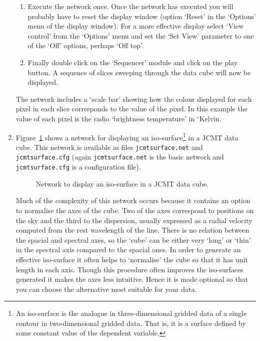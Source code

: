 \begin{enumerate}
\begin{enumerate}
    \item Execute the network once.  Once the network has executed you
     will probably have to reset the display window (option `Reset' in
     the `Options' menu of the display window).  For a more effective
     display select `View control' from the `Options' menu and set the
     `Set View' parameter to one of the `Off' options, perhaps `Off top'.

    \item Finally double click on the `Sequencer' module and click on
     the play button.  A sequence of slices sweeping through the data
     cube will now be displayed.

  \end{enumerate}

   The network includes a `scale bar' showing how the colour displayed
   for each pixel in each slice corresponds to the value of the pixel.
   In this example the value of each pixel is the radio `brightness
   temperature' in $^{\circ}$Kelvin.

  \item Figure~\ref{JCMTSURFACE} shows a network for displaying an
   iso-surface\footnote{An iso-surface is the analogue in
   three-dimensional gridded data of a single contour in two-dimensional
   gridded data. That is, it is a surface defined by some constant value
   of the dependent variable.} in a JCMT data cube.  This network is
   available as files {\tt jcmtsurface.net} and {\tt jcmtsurface.cfg}
   (again {\tt jcmtsurface.net} is the basic network and {\tt
   jcmtsurface.cfg} is a configuration file).

  \begin{figure}[htbp]

  \begin{center}
  \leavevmode
  \epsfxsize=450pt
  \end{center}

  \caption[Network to display an iso-surface in a JCMT data cube.]
   {Network to display an iso-surface in a JCMT data cube.
   \label{JCMTSURFACE} }

  \end{figure}

   Much of the complexity of this network occurs because it contains an
   option to normalise the axes of the cube.  Two of the axes correspond
   to positions on the sky and the third to the dispersion, usually
   expressed as a radial velocity computed from the rest wavelength of
   the line.  There is no relation between the spacial and spectral
   axes, so the `cube' can be either very `long' or `thin' in the
   spectral axis compared to the spacial ones.  In order to generate
   an effective iso-surface it often helps to `normalise' the cube
   so that it has unit length in each axis.  Though this procedure
   often improves the iso-surfaces generated it makes the axes less
   intuitive.  Hence it is made optional so that you can choose the
   alternative most suitable for your data.


\end{enumerate}
